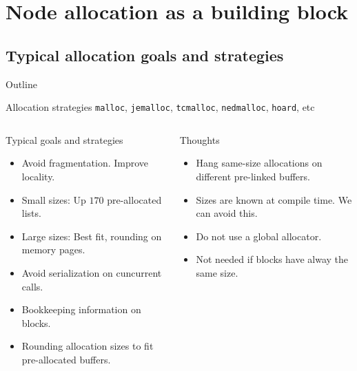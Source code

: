 \documentclass[10pt,aspectratio=169]{beamer}
\begin{document}
\section{Node allocation as a building block}
\subsection{Typical allocation goals and strategies}

\begin{frame}{Outline}
\end{frame}

\begin{frame}{Allocation strategies}
{\texttt{malloc}, \texttt{jemalloc}, \texttt{tcmalloc},
\texttt{nedmalloc}, \texttt{hoard}, etc}
\begin{columns}
\begin{column}{0.45\textwidth}
\begin{block} {Typical goals and strategies}
\begin{itemize}
\item<alert@1> Avoid fragmentation. Improve locality.
\item<alert@2> Small sizes: Up $170$ pre-allocated lists.
\item<alert@3> Large sizes: Best fit, rounding on memory pages.
\item<alert@4> Avoid serialization on cuncurrent calls.
\item<alert@5> Bookkeeping information on blocks.
\item<alert@2> Rounding allocation sizes to fit pre-allocated buffers.
\end{itemize}
\end{block}
\end{column}

\begin{column}{0.45\textwidth}
\begin{block} {Thoughts}
\begin{itemize}
\item<alert@1> Hang same-size allocations on different pre-linked buffers.
\item<alert@2> Sizes are known at compile time. We can avoid this.
\item<alert@3> Do not use a global allocator.
\item<alert@4> Not needed if blocks have alway the same size.
\end{itemize}
\end{block}

\end{column}
\end{columns}
\end{frame}
\end{document}
